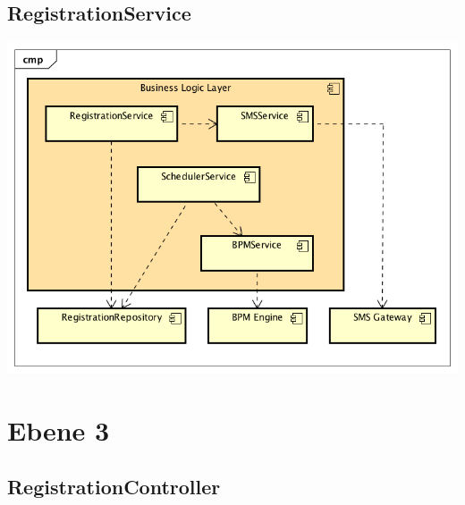 \subsection{RegistrationService}

\begin{center}
	\includegraphics[scale=0.8]{RegistrationServicesLevel2.png}
\end{center}

\section{Ebene 3}

\subsection{RegistrationController}

